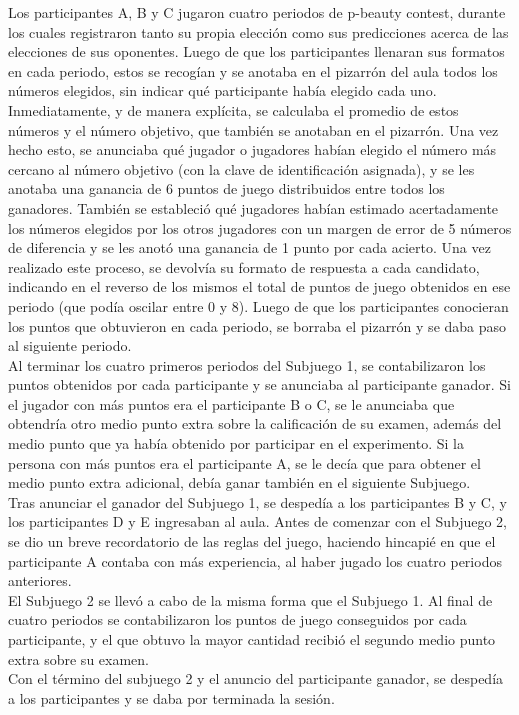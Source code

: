 Los participantes A, B y C jugaron cuatro periodos de p-beauty contest, durante los cuales registraron tanto su propia elección como sus predicciones acerca de las elecciones de sus oponentes. Luego de que los participantes llenaran sus formatos en cada periodo, estos se recogían y se anotaba en el pizarrón del aula todos los números elegidos, sin indicar qué participante había elegido cada uno. Inmediatamente, y de manera explícita, se calculaba el promedio de estos números y el número objetivo, que también se anotaban en el pizarrón. Una vez hecho esto, se anunciaba qué jugador o jugadores habían elegido el número más cercano al número objetivo (con la clave de identificación asignada), y se les anotaba una ganancia de 6 puntos de juego distribuidos entre todos los ganadores. También se estableció qué jugadores habían estimado acertadamente los números elegidos por los otros jugadores con un margen de error de 5 números de diferencia y se les anotó una ganancia de 1 punto por cada acierto. Una vez realizado este proceso, se devolvía su formato de respuesta a cada candidato, indicando en el reverso de los mismos el total de puntos de juego obtenidos en ese periodo (que podía oscilar entre 0 y 8). Luego de que los participantes conocieran los puntos que obtuvieron en cada periodo, se borraba el pizarrón y se daba paso al siguiente periodo.\\

Al terminar los cuatro primeros periodos del Subjuego 1, se contabilizaron los puntos obtenidos por cada participante y se anunciaba al participante ganador. Si el jugador con más puntos era el participante B o C, se le anunciaba que obtendría otro medio punto extra sobre la calificación de su examen, además del medio punto que ya había obtenido por participar en el experimento. Si la persona con más puntos era el participante A, se le decía que para obtener el medio punto extra adicional, debía ganar también en el siguiente Subjuego.\\

Tras anunciar el ganador del Subjuego 1, se despedía a los participantes B y C, y los participantes D y E ingresaban al aula. Antes de comenzar con el Subjuego 2, se dio un breve recordatorio de las reglas del juego, haciendo hincapié en que el participante A contaba con más experiencia, al haber jugado los cuatro periodos anteriores.\\

El Subjuego 2 se llevó a cabo de la misma forma que el Subjuego 1. Al final de cuatro periodos se contabilizaron los puntos de juego conseguidos por cada participante, y el que obtuvo la mayor cantidad recibió el segundo medio punto extra sobre su examen.\\

Con el término del subjuego 2 y el anuncio del participante ganador, se despedía a los participantes y se daba por terminada la sesión.\\

